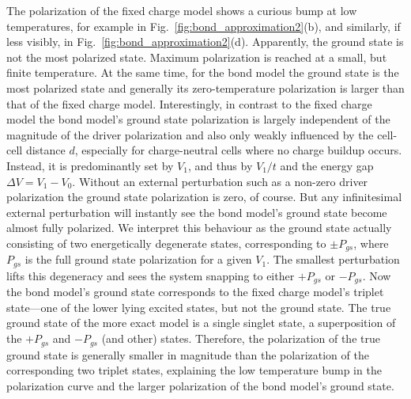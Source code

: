 The polarization of the fixed charge model shows a curious bump at low
temperatures, for example in Fig.~\ref{fig:bond_approximation2}(b), and
similarly, if less visibly, in Fig.~\ref{fig:bond_approximation2}(d).
Apparently, the ground state is not the most polarized state. Maximum
polarization is reached at a small, but finite temperature. At the same time,
for the bond model the ground state is the most polarized state and generally
its zero-temperature polarization is larger than that of the fixed charge model.
Interestingly, in contrast to the fixed charge model the bond model's ground
state polarization is largely independent of the magnitude of the driver
polarization and also only weakly influenced by the cell-cell distance $d$,
especially for charge-neutral cells where no charge buildup occurs. Instead, it
is predominantly set by $V_1$, and thus by $V_1/t$ and the energy gap $\Delta V
= V_1 - V_0$. Without an external perturbation such as a non-zero driver
polarization the ground state polarization is zero, of course. But any
infinitesimal external perturbation will instantly see the bond model's ground
state become almost fully polarized. We interpret this behaviour as the ground
state actually consisting of two energetically degenerate states, corresponding
to $\pm P_{gs}$, where $P_{gs}$ is the full ground state polarization for a
given $V_1$. The smallest perturbation lifts this degeneracy and sees the system
snapping to either $+P_{gs}$ or $-P_{gs}$. Now the bond model's ground state
corresponds to the fixed charge model's triplet state---one of the lower lying
excited states, but not the ground state. The true ground state of the more
exact model is a single singlet state, a superposition of the $+P_{gs}$ and
$-P_{gs}$ (and other) states. Therefore, the polarization of the true ground
state is generally smaller in magnitude than the polarization of the
corresponding two triplet states, explaining the low temperature bump in the
polarization curve and the larger polarization of the bond model's ground state.

